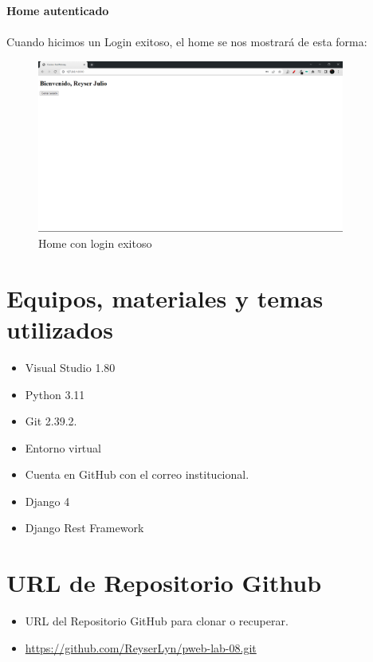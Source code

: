 \documentclass{article}
\begin{document}
     \textbf{Home autenticado}\\\\
        Cuando hicimos un Login exitoso, el home se nos mostrará de esta forma:
     
        \begin{figure}[H]
            \centering
            \includegraphics[width=0.9\textwidth,keepaspectratio]{img/dni/homeLogeado.png}
            \caption{Home con login exitoso}
            \label{fig:enter-label}
        \end{figure}
    
\section{Equipos, materiales y temas utilizados}
	\begin{itemize}
		\item Visual Studio 1.80
		\item Python 3.11
		\item Git 2.39.2.
            \item Entorno virtual
		\item Cuenta en GitHub con el correo institucional.
            \item Django 4
		\item Django Rest Framework
	\end{itemize}
	
	\section{URL de Repositorio Github}
	\begin{itemize}
		\item URL del Repositorio GitHub para clonar o recuperar.
		\item \url{https://github.com/ReyserLyn/pweb-lab-08.git}
	\end{itemize}
	
\end{document}
